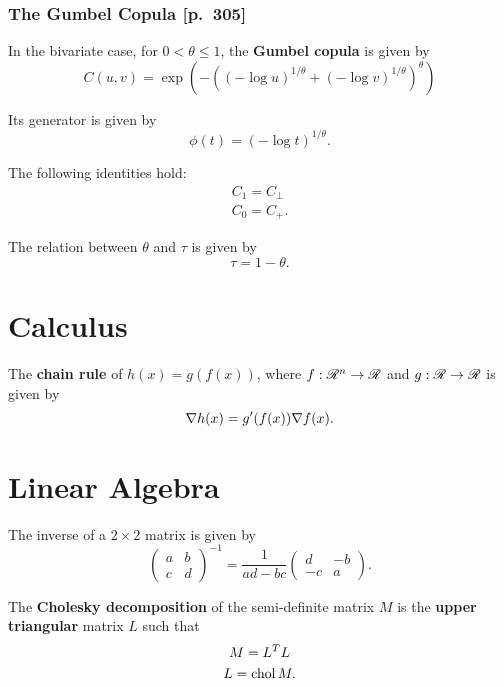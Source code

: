 \documentclass[10pt]{article}
\begin{document}
\subsubsection{The Gumbel Copula [p.~305]}
\begin{outline}
  \1 In the bivariate case, for $0<\theta\leq1$, the \textbf{Gumbel copula} is given by
  \begin{equation*}
    C(u,v) = \exp(-((-\log u)^{1/\theta} + (-\log v)^{1/\theta})^\theta)
  \end{equation*}

  \1 Its generator is given by
  \begin{equation*}
    \phi(t) = (-\log t)^{1/\theta}.
  \end{equation*}

  \1 The following identities hold:
  \begin{gather*}
    C_1 = C_\perp\\
    C_0 = C_{+}.
  \end{gather*}

  \1 The relation between $\theta$ and $\tau$ is given by
  \begin{equation*}
    \tau = 1-\theta.
  \end{equation*}
\end{outline}


\section{Calculus}
\begin{outline}
\1 The \textbf{chain rule} of $h(x) = g(f(x))$, where $f:\mathscr{R}^n\to\mathscr{R}$ and
$g:\mathscr{R}\to\mathscr{R}$ is given by
\begin{equation*}
\nabla h(x) = g'(f(x))\nabla f(x).  
\end{equation*}
\end{outline}


\section{Linear Algebra}
\begin{outline}
  \1 The inverse of a $2\times2$ matrix is given by
  \begin{equation*}
    \begin{pmatrix}a&b\\c&d\end{pmatrix}^{-1} = \frac{1}{ad-bc}\begin{pmatrix}d&-b\\-c&a\end{pmatrix}.
  \end{equation*}

  \1 The \textbf{Cholesky decomposition} of the semi-definite matrix $M$ is the
  \textbf{upper triangular} matrix $L$ such that
  \begin{gather*}
    M = L^TL\\
    L = \operatorname{chol} M.
  \end{gather*}
\end{outline}
\end{document}

